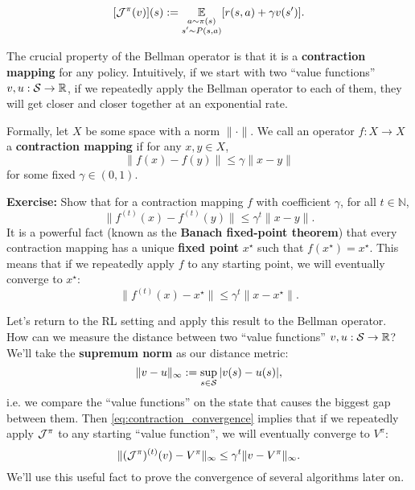 \documentclass[../main/main]{subfiles}
\begin{document}
\[
    [\bop^{\pi}(v)](s) := \E_{\substack{a \sim \pi(s) \\ s' \sim P(s, a)}} [r(s, a) + \gamma v(s')].
\]

The crucial property of the Bellman operator is that it is a \textbf{contraction mapping} for any policy. Intuitively, if we start with two ``value functions'' $v, u : \S \to \R$, if we repeatedly apply the Bellman operator to each of them, they will get closer and closer together at an exponential rate.

Formally, let $X$ be some space with a norm $\|\cdot\|$. We call an operator $f: X \to X$ a \textbf{contraction mapping} if for any $x, y \in X$,
\[
    \|f(x) - f(y)\| \le \gamma \|x - y\|
\]
for some fixed $\gamma \in (0, 1)$.

\textbf{Exercise:} Show that for a contraction mapping $f$ with coefficient $\gamma$, for all $t \in \mathbb{N}$,
\[
    \|f^{(t)}(x) - f^{(t)}(y)\| \le \gamma^t \|x - y\|.
\]
It is a powerful fact (known as the \textbf{Banach fixed-point theorem}) that every contraction mapping has a unique \textbf{fixed point} $x^\star$ such that $f(x^\star) = x^\star$. This means that if we repeatedly apply $f$ to any starting point, we will eventually converge to $x^\star$:
\begin{equation}
    \|f^{(t)}(x) - x^\star\| \le \gamma^t \|x - x^\star\|. \label{eq:contraction_convergence}
\end{equation}

Let's return to the RL setting and apply this result to the Bellman operator. How can we measure the distance between two ``value functions'' $v, u : \S \to \R$? We'll take the \textbf{supremum norm} as our distance metric:
\[
    \| v - u \|_{\infty} := \sup_{s \in \S} |v(s) - u(s)|,
\]
i.e. we compare the ``value functions'' on the state that causes the biggest gap between them.
Then \eqref{eq:contraction_convergence} implies that if we repeatedly apply $\bop^\pi$ to any starting ``value function'', we will eventually converge to $V^\pi$:
\begin{equation}
    \|(\bop^\pi)^{(t)}(v) - V^\pi \|_{\infty} \le \gamma^{t} \| v - V^\pi\|_{\infty}. \label{eq:bellman_convergence}
\end{equation}
We'll use this useful fact to prove the convergence of several algorithms later on.
\end{document}
